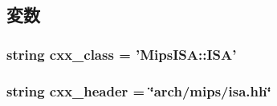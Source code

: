\subsection{変数}
\hypertarget{classMipsISA_1_1MipsISA_a58cd55cd4023648e138237cfc0822ae3}{
\subsubsection[{cxx\_\-class}]{\setlength{\rightskip}{0pt plus 5cm}string {\bf cxx\_\-class} = '{\bf MipsISA::ISA}'}}
\label{classMipsISA_1_1MipsISA_a58cd55cd4023648e138237cfc0822ae3}
\hypertarget{classMipsISA_1_1MipsISA_a17da7064bc5c518791f0c891eff05fda}{
\subsubsection[{cxx\_\-header}]{\setlength{\rightskip}{0pt plus 5cm}string {\bf cxx\_\-header} = \char`\"{}arch/mips/isa.hh\char`\"{}}}
\label{classMipsISA_1_1MipsISA_a17da7064bc5c518791f0c891eff05fda}


